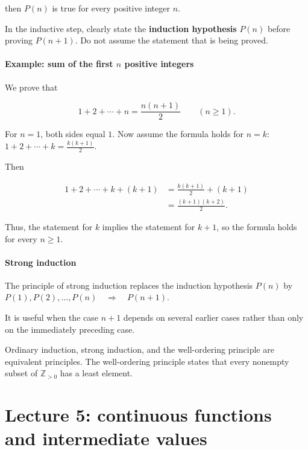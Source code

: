 \documentclass[11pt,a4paper]{article}
\begin{document}
then \(P(n)\) is true for every positive integer \(n\).

In the inductive step, clearly state the \textbf{induction hypothesis}
\(P(n)\) before proving \(P(n+1)\). Do not assume the statement that is
being proved.

\paragraph{\texorpdfstring{Example: sum of the first \(n\) positive
integers}{Example: sum of the first n positive integers}}\label{example-sum-of-the-first-n-positive-integers}

We prove that

\[
1+2+\cdots+n=\frac{n(n+1)}{2}
\qquad(n\geq1).
\]

For \(n=1\), both sides equal \(1\). Now assume the formula holds for
\(n=k\): \(1+2+\cdots+k=\frac{k(k+1)}{2}.\)

Then

\[
\begin{aligned}
1+2+\cdots+k+(k+1)
&=\frac{k(k+1)}{2}+(k+1)\\
&=\frac{(k+1)(k+2)}{2}.
\end{aligned}
\]

Thus, the statement for \(k\) implies the statement for \(k+1\), so the
formula holds for every \(n\geq1\).

\paragraph{Strong induction}\label{strong-induction}

The principle of strong induction replaces the induction hypothesis
\(P(n)\) by \(P(1),P(2),\ldots,P(n)\quad\Longrightarrow\quad P(n+1).\)

It is useful when the case \(n+1\) depends on several earlier cases
rather than only on the immediately preceding case.

Ordinary induction, strong induction, and the well-ordering principle
are equivalent principles. The well-ordering principle states that every
nonempty subset of \(\mathbb{Z}_{>0}\) has a least element.

\section{Lecture 5: continuous functions and intermediate
values}\label{lecture-5-continuous-functions-and-intermediate-values}
\end{document}
